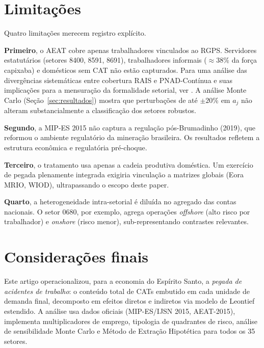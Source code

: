 \documentclass[12pt, a4paper]{article}
\begin{document}
\section{Limitações}
\label{sec:limitacoes}

Quatro limitações merecem registro explícito.

\textbf{Primeiro}, o AEAT cobre apenas trabalhadores vinculados ao RGPS.
Servidores estatutários (setores 8400, 8591, 8691), trabalhadores
informais ($\approx 38\%$ da força capixaba) e domésticos sem CAT
não estão capturados. Para uma análise das divergências sistemáticas
entre cobertura RAIS e PNAD-Contínua e suas implicações para a
mensuração da formalidade setorial, ver \citet[cap.~4]{corseuil2026rais}.
A análise Monte Carlo (Seção~\ref{sec:resultados})
mostra que perturbações de até $\pm 20\%$ em $a_j$ não alteram
substancialmente a classificação dos setores robustos.

\textbf{Segundo}, a MIP-ES 2015 não captura a regulação pós-Brumadinho
(2019), que reformou o ambiente regulatório da mineração brasileira.
Os resultados refletem a estrutura econômica e regulatória pré-choque.

\textbf{Terceiro}, o tratamento usa apenas a cadeia produtiva doméstica.
Um exercício de pegada plenamente integrada exigiria vinculação a
matrizes globais (Eora MRIO, WIOD), ultrapassando o escopo deste paper.

\textbf{Quarto}, a heterogeneidade intra-setorial é diluída no agregado
das contas nacionais. O setor 0680, por exemplo, agrega operações
\textit{offshore} (alto risco por trabalhador) e \textit{onshore}
(risco menor), sub-representando contrastes relevantes.

\section{Considerações finais}
\label{sec:conclusao}

Este artigo operacionalizou, para a economia do Espírito Santo, a
\textit{pegada de acidentes de trabalho}: o conteúdo total de CATs
embutido em cada unidade de demanda final, decomposto em efeitos
diretos e indiretos via modelo de Leontief estendido. A análise usa
dados oficiais (MIP-ES/IJSN 2015, AEAT-2015), implementa multiplicadores
de emprego, tipologia de quadrantes de risco, análise de sensibilidade
Monte Carlo e Método de Extração Hipotética para todos os 35 setores.
\end{document}
